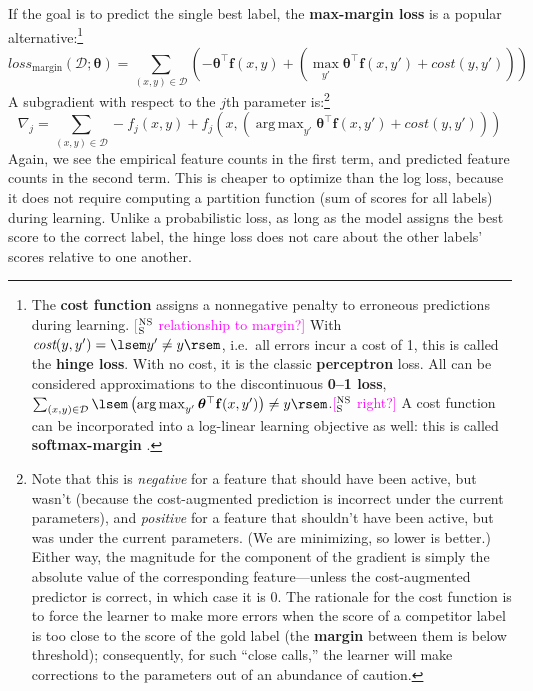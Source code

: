 \documentclass[11pt,letterpaper]{article}
\DeclareMathOperator*{\argmax}{arg\,max}
\newcommand{\ensuretext}[1]{#1}
\newcommand{\nssmarker}{\ensuretext{\textcolor{magenta}{\ensuremath{^{\textsc{NS}}_{\textsc{S}}}}}}
\newcommand{\arkcomment}[3]{\ensuretext{\textcolor{#3}{[#1 #2]}}}
\newcommand{\nss}[1]{\arkcomment{\nssmarker}{#1}{magenta}}
\begin{document}
If the goal is to predict the single best label, the \textbf{max-margin loss} is a popular alternative:\footnote{The \textbf{cost function} assigns a nonnegative penalty to erroneous predictions during learning.
\nss{relationship to margin?} 
With $\textit{cost}(y,y')=\lsem y'\neq y\rsem$, i.e.~all errors incur a cost of 1, this is called the \textbf{hinge loss}. 
With no cost, it is the classic \textbf{perceptron} loss.
All can be considered approximations to the discontinuous \textbf{0--1 loss},
$\sum_{(x,y)\in\mathcal{D}}{\lsem \left(\argmax_{y'}{\boldsymbol{\theta}^\top\mathbf{f}(x,y')}\right)\neq y \rsem}$.\nss{right?}
A cost function can be incorporated into a log-linear learning objective as well: this is called \textbf{softmax-margin} \citep{gimpel-10}.}
\begin{equation}\label{eq:marginloss}
\textit{loss}_\text{margin}(\mathcal{D}; \boldsymbol{\theta}) = \sum_{(x,y)\in\mathcal{D}}{\left(- \boldsymbol{\theta}^\top\mathbf{f}(x,y) + \left(\max_{y'}{\boldsymbol{\theta}^\top\mathbf{f}(x,y') + \textit{cost}(y,y')}\right)\right)} 
\end{equation}
A subgradient with respect to the $j$th parameter is:\footnote{Note that this is {\em negative} 
for a feature that should have been active, but wasn't 
(because the cost-augmented prediction is incorrect under the current parameters), 
and {\em positive} for a feature that shouldn't have been active, but was under the current parameters.
(We are minimizing, so lower is better.)
Either way, the magnitude for the component of the gradient is simply the absolute value of the corresponding 
feature---unless the cost-augmented predictor is correct, in which case it is 0. 
The rationale for the cost function is to force the learner to make more errors when the score of a competitor label 
is too close to the score of the gold label (the \textbf{margin} between them is below threshold);
consequently, for such ``close calls,'' the learner will make corrections to the parameters out of an abundance of caution.}
\begin{equation}\label{eq:margingrad}
\nabla_j = \sum_{(x,y)\in\mathcal{D}} -f_j(x,y) + f_j(x,\left(\argmax_{y'}{\boldsymbol{\theta}^\top\mathbf{f}(x,y')+\textit{cost}(y,y')}\right))
\end{equation}
Again, we see the empirical feature counts in the first term, and predicted feature counts in the second term.
This is cheaper to optimize than the log loss, because it does not require computing a partition function 
(sum of scores for all labels) during learning.
Unlike a probabilistic loss, as long as the model assigns the best score to the correct label, 
the hinge loss does not care about the other labels' scores relative to one another. 
\end{document}
